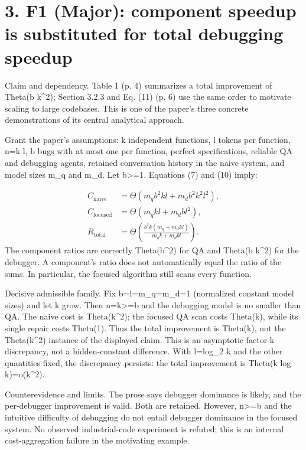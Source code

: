 \documentclass[10pt]{article}
\begin{document}
\section*{3. F1 (Major): component speedup is substituted for total debugging speedup}
Claim and dependency. Table 1 (p. 4) summarizes a total improvement of Theta(b k\textasciicircum{}2); Section 3.2.3 and Eq. (11) (p. 6) use the same order to motivate scaling to large codebases. This is one of the paper’s three concrete demonstrations of its central analytical approach.\par
Grant the paper’s assumptions: k independent functions, l tokens per function, n=k l, b bugs with at most one per function, perfect specifications, reliable QA and debugging agents, retained conversation history in the naive system, and model sizes m\_q and m\_d. Let b>=1. Equations (7) and (10) imply:\par
\[\begin{aligned}
 C_{\mathrm{naive}}&=\Theta(m_q b^2kl+m_d b^2k^2l^2),\\
 C_{\mathrm{focused}}&=\Theta(m_qkl+m_dbl^2),\\
 R_{\mathrm{total}}&=\Theta\!\left(\frac{b^2k(m_q+m_dkl)}{m_qk+m_dbl}\right).
\end{aligned}\] The component ratios are correctly Theta(b\textasciicircum{}2) for QA and Theta(b k\textasciicircum{}2) for the debugger. A component’s ratio does not automatically equal the ratio of the sums. In particular, the focused algorithm still scans every function.\par
Decisive admissible family. Fix b=l=m\_q=m\_d=1 (normalized constant model sizes) and let k grow. Then n=k>=b and the debugging model is no smaller than QA. The naive cost is Theta(k\textasciicircum{}2); the focused QA scan costs Theta(k), while its single repair costs Theta(1). Thus the total improvement is Theta(k), not the Theta(k\textasciicircum{}2) instance of the displayed claim. This is an asymptotic factor-k discrepancy, not a hidden-constant difference. With l=log\_2 k and the other quantities fixed, the discrepancy persists: the total improvement is Theta(k log k)=o(k\textasciicircum{}2).\par
Counterevidence and limits. The prose says debugger dominance is likely, and the per-debugger improvement is valid. Both are retained. However, n>=b and the intuitive difficulty of debugging do not entail debugger dominance in the focused system. No observed industrial-code experiment is refuted; this is an internal cost-aggregation failure in the motivating example.\par
\end{document}
